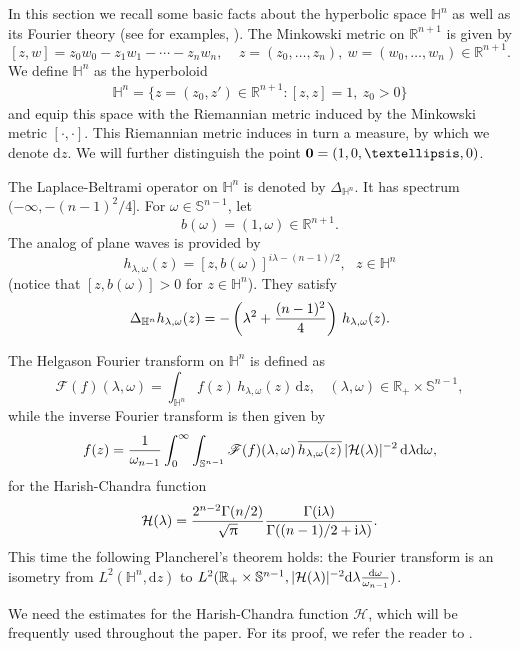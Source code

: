 \documentclass[11pt]{amsproc}
\newcommand{\0}{\mathbf{0}}
\newcommand{\bc}{{ \mathcal{H} }}
\newcommand{\F}{\mathscr{F}}
\renewcommand{\H}{\mathbb{H}}
\renewcommand{\i}{\mathrm{i}}
\renewcommand{\d}{\mathrm{d}}
\numberwithin{equation}{section}
\numberwithin{figure}{section}
\theoremstyle{definition}
\theoremstyle{remark}
\numberwithin{thm}{section}
\begin{document}
In  this section  we recall some basic facts about the hyperbolic space $\H^n$ as well as its Fourier theory (see for examples, \cite{He, IoSt, Pe}).
The Minkowski metric on ${\mathbb R^{n+1}}$ is given by
$$
[z,w]=z_0w_0 -z_1w_1-\cdots -z_nw_n,\ \ \   \ \  z=(z_0,\dots, z_n), \ w= (w_0,\dots,w_n)\in {\mathbb R^{n+1}}.
$$
We define $\H^n$ as the hyperboloid
\begin{eqnarray*}
\H^n=\{z=(z_0,z')\in {\mathbb R^{n+1}}: [z, z]=1, \  z_0>0\}
\end{eqnarray*}
and equip this space with the Riemannian metric induced by the Minkowski metric $[\cdot,\cdot]$. This Riemannian metric induces in turn a measure, by which we denote $\d z$. We will further distinguish the point ${\bf 0}=(1, 0, \dots, 0)$.

The Laplace-Beltrami operator on $	\H^n$ is denoted by $\Delta_{	\H^n}$. It has spectrum $(-\infty, -(n-1)^2/4]$. For $\omega\in {\mathbb S}^{n-1}$, let
$$
b(\omega)=(1, \omega)\in {\mathbb R}^{n+1}.
$$
The analog of plane waves is provided by
$$
h_{\lambda, \omega}(z)=[z, b(\omega)]^{i\lambda-(n-1)/2}, \ \ \ z\in 	\H^n
$$
(notice that $[z, b(\omega)]>0 $ for $z\in 	\H^n$). They satisfy
$$
\Delta_{	\H^n}h_{\lambda, \omega}(z)=-\left(\lambda^2 +{(n-1)^2\over 4}\right)\, h_{\lambda, \omega}(z).
$$

The Helgason Fourier transform on $\H^n$ is defined as
\begin{equation}\label{e2.111}
{\F}(f)(\lambda, \omega)=\int_{\H^n} f(z)\, h_{\lambda, \omega}(z)\,\d z, \ \ \ \  (\lambda, \omega) \in {\mathbb R}_+ \times {\mathbb S}^{n-1},
\end{equation}
while the inverse Fourier transform is then given by
\begin{equation}\label{e2.112}
f(z)= {1\over \omega_{n-1}} \int_0^{\infty}\int_{\mathbb S^{n-1}}  {\F}(f)(\lambda, \omega)\, {\overline{
h_{\lambda, \omega}(z)}}\, |\bc(\lambda)|^{-2}\,\d\lambda\d\omega,
\end{equation}
for the Harish-Chandra function
\begin{eqnarray}\label{e2.1}
\bc(\lambda)= {2^{n-2}\Gamma(n/2)\over \sqrt{\uppi}}{\Gamma(\i\lambda)\over\Gamma((n-1)/2+\i\lambda)}.
\end{eqnarray}
This time the following Plancherel's theorem holds: the Fourier transform is an isometry from $L^2(\H^n, \d z)$ to $L^2({\mathbb R_+}\times {\mathbb S^{n-1}},  |\bc(\lambda)|^{-2} \d\lambda {\d\omega \over \omega_{n-1}} )$.

We need the estimates for the Harish-Chandra function $\bc$, which will be frequently used throughout the paper.
For its proof, we refer the reader to \cite[Proposition A1(a)(b)]{Io}.
\end{document}
